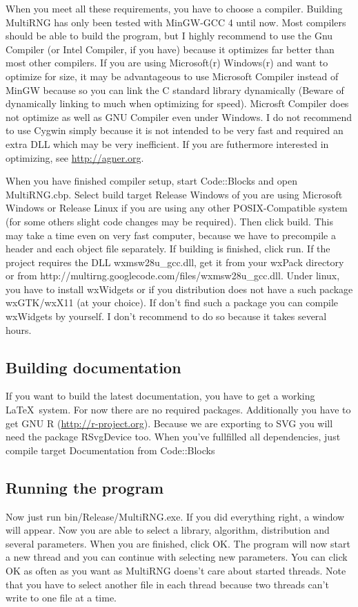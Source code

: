 \documentclass{scrartcl}
\begin{document}
When you meet all these requirements, you have to choose a compiler. Building MultiRNG has only been tested with MinGW-GCC 4 until now. Most compilers should be able to build the program, but I highly recommend to use the Gnu Compiler (or Intel Compiler, if you have) because it optimizes far better than most other compilers. If you are using Microsoft(r) Windows(r) and want to optimize for size, it may be advantageous to use Microsoft Compiler instead of MinGW because so you can link the C standard library dynamically (Beware of dynamically linking to much when optimizing for speed). Microsft Compiler does not optimize as well as GNU Compiler even under Windows. I do not recommend to use Cygwin simply because it is not intended to be very fast and required an extra DLL which may be very inefficient. If you are futhermore interested in optimizing, see \url{http://agner.org}.\newline

When you have finished compiler setup, start Code::Blocks and open MultiRNG.cbp. Select build target Release Windows of you are using Microsoft Windows or Release Linux if you are using any other POSIX-Compatible system (for some others slight code changes may be required). Then click build. This may take a time even on very fast computer, because we have to precompile a header and each object file separately. If building is finished, click run. If the project requires the DLL wxmsw28u\_gcc.dll, get it from your wxPack directory or from http://multirng.googlecode.com/files/wxmsw28u\_gcc.dll. Under linux, you have to install wxWidgets or if you distribution does not have a such package wxGTK/wxX11 (at your choice). If don't find such a package you can compile wxWidgets by yourself. I don't recommend to do so because it takes several hours.

\subsection{Building documentation}
If you want to build the latest documentation, you have to get a working \LaTeX\ system. For now there are no required packages. Additionally you have to get GNU R (\url{http://r-project.org}). Because we are exporting to SVG you will need the package RSvgDevice too. When you've fullfilled all dependencies, just compile target Documentation from Code::Blocks

\subsection{Running the program}
Now just run bin/Release/MultiRNG.exe. If you did everything right, a window will appear. Now you are able to select a library, algorithm, distribution and several parameters. When you are finished, click OK. The program will now start a new thread and you can continue with selecting new parameters. You can click OK as often as you want as MultiRNG doens't care about started threads. Note that you have to select another file in each thread because two threads can't write to one file at a time. 
\end{document}

